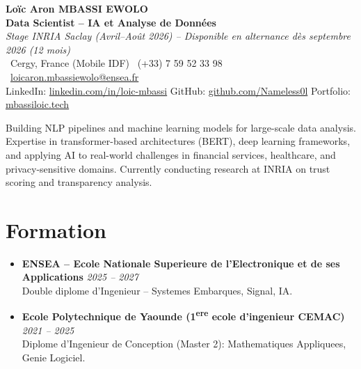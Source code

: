 \documentclass[a4paper,11pt]{article}
\begin{document}
\begin{center}
    {\Large \textbf{Lo\"ic Aron MBASSI EWOLO}} \\ \vspace{4pt}
    \textbf{\large Data Scientist -- IA et Analyse de Donn\'ees} \\
    \textit{\small Stage INRIA Saclay (Avril--Ao\^ut 2026) -- Disponible en alternance d\`es septembre 2026 (12 mois)} \\ \vspace{4pt}
    \small
    \Pointinghand\ Cergy, France (Mobile IDF) \quad
    \Mobilefone\ (+33) 7 59 52 33 98 \quad
    {\color{primary}\Letter\ \href{mailto:loicaron.mbassiewolo@ensea.fr}{loicaron.mbassiewolo@ensea.fr}} \\ \vspace{2pt}
    {\color{primary}LinkedIn: \href{https://www.linkedin.com/in/loic-mbassi/}{linkedin.com/in/loic-mbassi}} \quad
    {\color{primary}GitHub: \href{https://github.com/Nameless0l}{github.com/Nameless0l}} \quad
    {\color{primary}Portfolio: \href{https://mbassiloic.tech}{mbassiloic.tech}}
\end{center}
\vspace{-6pt}

\noindent\small{Building NLP pipelines and machine learning models for large-scale data analysis. Expertise in transformer-based architectures (BERT), deep learning frameworks, and applying AI to real-world challenges in financial services, healthcare, and privacy-sensitive domains. Currently conducting research at INRIA on trust scoring and transparency analysis.}

\section{Formation}
\begin{itemize}[leftmargin=*, label=\tiny$\bullet$, nosep]
    \item \textbf{ENSEA -- Ecole Nationale Superieure de l'Electronique et de ses Applications} \hfill \textit{2025 -- 2027} \\
    \small{Double diplome d'Ingenieur -- Systemes Embarques, Signal, IA.}
    \item \textbf{Ecole Polytechnique de Yaounde (1\textsuperscript{ere} ecole d'ingenieur CEMAC)} \hfill \textit{2021 -- 2025} \\
    \small{Diplome d'Ingenieur de Conception (Master 2): Mathematiques Appliquees, Genie Logiciel.}
\end{itemize}
\end{document}
